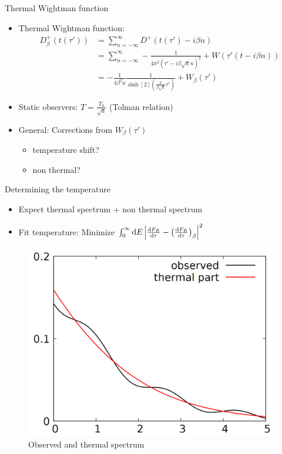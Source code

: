 \documentclass{beamer}
\begin{document}
\begin{frame}{Thermal Wightman function}

\begin{itemize}
	\item Thermal Wightman function:
	\begin{align*}
		D_\beta^+(t(\tau')) &= \sum_{n=-\infty}^\infty D^+(t(\tau') - i \beta n)\\
			&= \sum_{n=-\infty}^\infty -\frac{1}{4\pi^2 (\tau' - i\beta \sqrt{a} n)^2} + W(\tau'(t - i\beta n))\\
			&= -\frac{1}{4\beta^2 a} \frac{1}{\sinh[2](\frac{\pi}{\beta \sqrt{a}} \tau')} + W_\beta(\tau')
	\end{align*}
	\item Static observers: \(T = \frac{T_0}{\sqrt{a}}\) (Tolman relation)
	\item General: Corrections from \(W_\beta(\tau')\)
	\begin{itemize}
		\item temperature shift?
		\item non thermal?
	\end{itemize}
\end{itemize}
\end{frame}

\begin{frame}{Determining the temperature}
\begin{itemize}
	\item Expect thermal spectrum + non thermal spectrum
	\item Fit temperature: Minimize \(\int_0^\infty \dd{E} \qty|\dv{F_E}{\tau} - \qty(\dv{F_{E}}{\tau})_\beta|^2\)
\end{itemize}
\begin{figure}
\centering
\includegraphics[scale=0.15]{plot/thermal_fit.png}
\caption{Observed and thermal spectrum}
\end{figure}
\end{frame}
\end{document}
